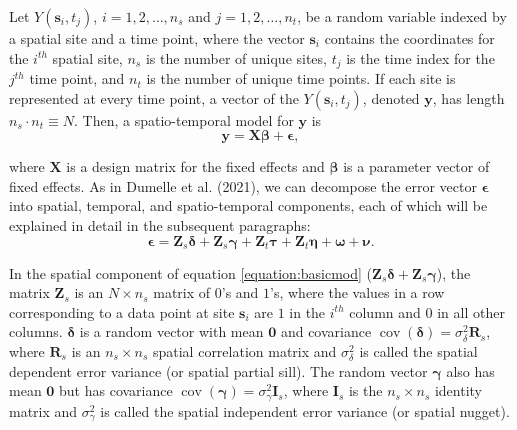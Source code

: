 \documentclass[smallextended]{svjour3}       %
\begin{document}
Let \(Y(\mathbf{s}_{i}, t_j)\), \(i = 1, 2, \ldots, n_{s}\) and
\(j = 1, 2, \ldots, n_{t}\), be a random variable indexed by a spatial
site and a time point, where the vector \(\mathbf{s}_i\) contains the
coordinates for the \(i^{th}\) spatial site, \(n_s\) is the number of
unique sites, \(t_j\) is the time index for the \(j^{th}\) time point,
and \(n_t\) is the number of unique time points. If each site is
represented at every time point, a vector of the
\(Y(\mathbf{s}_{i}, t_j)\), denoted \(\mathbf{y}\), has length
\(n_{s} \cdot n_{t} \equiv N\). Then, a spatio-temporal model for
\(\mathbf{y}\) is \mbox{} \begin{equation}
\mathbf{y} = \mathbf{X} \bm{\beta} + \bm{\epsilon},
\end{equation}

\noindent where \(\mathbf{X}\) is a design matrix for the fixed effects
and \(\bm{\beta}\) is a parameter vector of fixed effects. As in Dumelle
et al. (2021), we can decompose the error vector \(\bm{\epsilon}\) into
spatial, temporal, and spatio-temporal components, each of which will be
explained in detail in the subsequent paragraphs: \mbox{}
\begin{equation} \label{equation:basicmod}
\bm{\epsilon} = \mathbf{Z}_{s} \bm{\delta} + \mathbf{Z}_{s} \bm{\gamma} + \mathbf{Z}_t \bm{\tau} + \mathbf{Z}_t \bm{\eta} + \bm{\omega} + \bm{\nu}.
\end{equation}

In the spatial component of equation \ref{equation:basicmod}
(\(\mathbf{Z}_{s} \bm{\delta} + \mathbf{Z}_{s} \bm{\gamma}\)), the
matrix \(\mathbf{Z}_{s}\) is an \(N \times n_s\) matrix of \(0\)'s and
\(1\)'s, where the values in a row corresponding to a data point at site
\(\mathbf{s}_{i}\) are \(1\) in the \(i^{th}\) column and \(0\) in all
other columns. \(\bm{\delta}\) is a random vector with mean
\(\mathbf{0}\) and covariance
\(\mathop{\mathrm{{cov}}}(\bm{\delta}) = \sigma^2_{\delta} \mathbf{R}_{s}\),
where \(\mathbf{R}_s\) is an \(n_s \times n_s\) spatial correlation
matrix and \(\sigma^2_{\delta}\) is called the spatial dependent error
variance (or spatial partial sill). The random vector \(\bm{\gamma}\)
also has mean \(\mathbf{0}\) but has covariance
\(\mathop{\mathrm{{cov}}}(\bm{\gamma}) = \sigma^2_{\gamma} \mathbf{I}_{s}\),
where \(\mathbf{I}_s\) is the \(n_s \times n_s\) identity matrix and
\(\sigma^2_{\gamma}\) is called the spatial independent error variance
(or spatial nugget).
\end{document}
